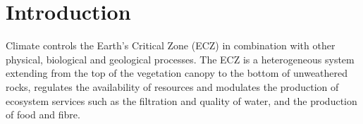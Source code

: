 \documentclass[authoryear,preprint,review,12pt]{elsarticle}
\begin{document}

\section{Introduction}



Climate controls the Earth's Critical Zone (ECZ) in combination with other physical, biological and geological processes.
The ECZ is a heterogeneous system extending from the top of the vegetation canopy to the bottom of unweathered rocks, regulates the availability of resources and modulates the production of ecosystem services such as the filtration and quality of water, and the production of food and fibre.

\end{document}
